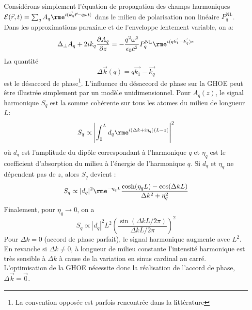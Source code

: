 Considérons simplement l'équation de propagation des champs harmoniques $\mathcal{E}(\vec{r},t) = \sum_q A_q \rme^{i(\vec{k_q} \vec{r} - q\omega t)}$ dans le milieu de polarisation non linéaire $P_q^{\text{NL}}$. Dans les approximations paraxiale et de l'enveloppe lentement variable, on a:
\begin{equation}
\Delta_\bot A_q + 2 i k_q \frac{\partial A_q}{\partial z}= -\frac{q^2 \omega^2}{\epsilon_0 c^2} P_q^{\text{NL}} \rme^{i(q \vec{k_1} - \vec{k_q})z}
\end{equation} 
La quantité
\begin{equation}
\Delta \vec{k} (q) = q \vec{k_1} - \vec{k_q}
\end{equation}
est le désaccord de phase\footnote{La convention opposée est parfois rencontrée dans la littérature}. L'influence du désaccord de phase sur la GHOE peut être illustrée simplement par un modèle unidimensionnel. Pour $A_q(z)$, le signal harmonique $S_q$ est la somme cohérente sur tous les atomes du milieu de longueur $L$:
\begin{equation}
S_q \propto \left| \int_0^L d_q \rme^{i(\Delta k + i \eta_q)(L-z)} \right|^2
\end{equation}
où $d_q$ est l'amplitude du dipôle correspondant à l'harmonique $q$ et $\eta_q$ est le coefficient d'absorption du milieu à l'énergie de l'harmonique $q$. Si $d_q$ et $\eta_q$ ne dépendent pas de $z$, alors $S_q$ devient :
\begin{equation}
S_q \propto |d_q|^2 \rme^{-\eta_q L} \frac{\cosh(\eta_q L) - \cos(\Delta k L)}{\Delta k^2 + \eta_q^2}
\end{equation}
Finalement, pour $\eta_q \rightarrow 0$, on a
\begin{equation}
S_q \propto |d_q|^2 L^2 \left( \frac{\sin(\Delta k L /2\pi)}{\Delta k L /2\pi}\right)^2
\end{equation}
Pour $\Delta k = 0$ (accord de phase parfait), le signal harmonique augmente avec $L^2$. En revanche si $\Delta k \neq 0$, à longueur de milieu constante l'intensité harmonique est très sensible à $\Delta k$ à cause de la variation en sinus cardinal au carré. L'optimisation de la GHOE nécessite donc la réalisation de l'accord de phase, $\Delta \vec{k} = \vec{0}$.

